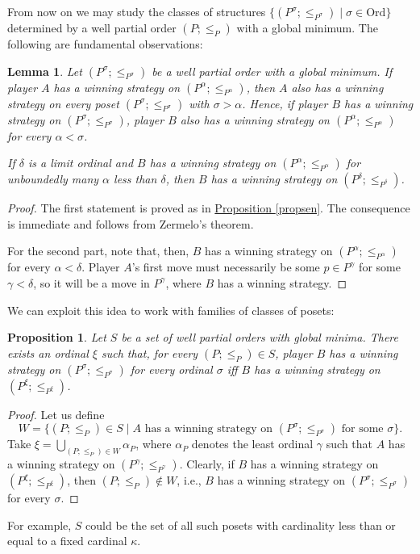 \documentclass[reqno]{amsart}
\newtheorem{lemma}[theorem]{Lemma}
\newtheorem{proposition}[theorem]{Proposition}
\theoremstyle{definition}
\theoremstyle{definition}
\theoremstyle{plain} %
\begin{document}
From now on we may study the classes of structures \(\{(P^\sigma; \leq_{P^\sigma}) \mid \sigma \in \mathrm{Ord}\}\) determined by a well partial order \((P; \leq_{P})\) with a global minimum. The following are fundamental observations:
\begin{lemma}\label{downtrans}
    Let \((P^\sigma; \leq_{P^\sigma})\) be a well partial order with a global minimum. If player $A$ has a winning strategy on $(P^\alpha;\leq_{P^\alpha})$, then $A$ also has a winning strategy on every poset $(P^\sigma;\leq_{P^\sigma})$ with $\sigma>\alpha$. Hence, if player $B$ has a winning strategy on $(P^\sigma;\leq_{P^\sigma})$, player $B$ also has a winning strategy on $(P^\alpha;\leq_{P^\alpha})$ for every $\alpha<\sigma$.

    If $\delta$ is a limit ordinal and $B$ has a winning strategy on $(P^\alpha;\leq_{P^\alpha})$ for unboundedly many $\alpha$ less than $\delta$, then $B$ has a winning strategy on $(P^\delta;\leq_{P^\delta})$.
\end{lemma}\begin{proof}
    The first statement is proved as in \hyperref[propsen]{Proposition \ref{propsen}}. The consequence is immediate and follows from Zermelo's theorem.
    
    For the second part, note that, then, $B$ has a winning strategy on $(P^\alpha; \leq_{P^\alpha})$ for every $\alpha < \delta$. Player $A$'s first move must necessarily be some $p\in P^\gamma$ for some $\gamma < \delta$, so it will be a move in $P^{\gamma}$, where $B$ has a winning strategy.
\end{proof}

We can exploit this idea to work with families of classes of posets:
\begin{proposition}
Let $S$ be a set of well partial orders with global minima. There exists an ordinal $\xi$ such that, for every $(P;\leq_P)\in S $, player $B$ has a winning strategy on $(P^\sigma;\leq_{P^\sigma})$ for every ordinal $\sigma$ iff $B$ has a winning strategy on $(P^\xi;\leq_{P^\xi})$.
\end{proposition}
\begin{proof}
Let us define $$W=\{(P;\leq_P)\in S \mid A\text{ has a winning strategy on $(P^\sigma;\leq_{P^\sigma})$ for some $\sigma$} \}.$$Take $\xi=\bigcup_{(P;\leq_P)\in W} \alpha_P$, where $\alpha_P$ denotes the least ordinal $\gamma$ such that $A$ has a winning strategy on $(P^{\gamma};\leq_{P^\gamma})$. Clearly, if $B$ has a winning strategy on $(P^{\xi};\leq_{P^\xi}) $, then $ (P;\leq_{P})\not\in W$, i.e., $B$ has a winning strategy on $(P^\sigma;\leq_{P^\sigma})$ for every $\sigma$.
\end{proof}For example, \(S\) could be the set of all such posets with cardinality less than or equal to a fixed cardinal \(\kappa\). 
\end{document}
